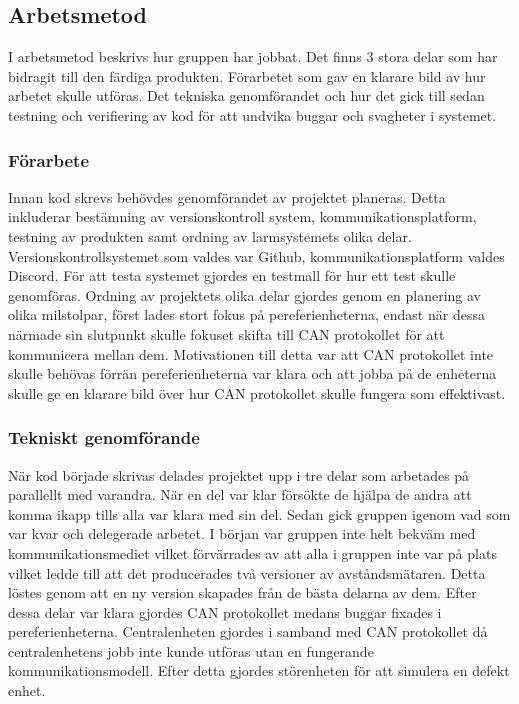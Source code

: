 \documentclass{article}
\begin{document}
\subsection{Arbetsmetod}
I arbetsmetod beskrivs hur gruppen har jobbat. Det finns 3 stora delar som har bidragit till den färdiga produkten. Förarbetet som gav en klarare bild av hur arbetet skulle utföras. Det tekniska genomförandet och hur det gick till sedan testning och verifiering av kod för att undvika buggar och svagheter i systemet.


\subsubsection{Förarbete}
Innan kod skrevs behövdes genomförandet av projektet planeras. 
Detta inkluderar bestämning av versionskontroll system, kommunikationsplatform, testning av produkten samt ordning av larmsystemets olika delar. 
Versionskontrollsystemet som valdes var Github, kommunikationsplatform valdes Discord. 
För att testa systemet gjordes en testmall för hur ett test skulle genomföras. 
Ordning av projektets olika delar gjordes genom en planering av olika milstolpar, först lades stort fokus på pereferienheterna, endast när dessa närmade sin slutpunkt skulle fokuset skifta till CAN protokollet för att kommunicera mellan dem. 
Motivationen till detta var att CAN protokollet inte skulle behövas förrän pereferienheterna var klara och att jobba på de enheterna skulle ge en klarare bild över hur CAN protokollet skulle fungera som effektivast.

\subsubsection{Tekniskt genomförande}
När kod började skrivas delades projektet upp i tre delar som arbetades på parallellt med varandra.
När en del var klar försökte de hjälpa de andra att komma ikapp tills alla var klara med sin del.
Sedan gick gruppen igenom vad som var kvar och delegerade arbetet. 
I början var gruppen inte helt bekväm med kommunikationsmediet vilket förvärrades av att alla i gruppen inte var på plats vilket ledde till att det producerades två versioner av avståndsmätaren.
Detta löstes genom att en ny version skapades från de bästa delarna av dem.
Efter dessa delar var klara gjordes CAN protokollet medans buggar fixades i pereferienheterna. Centralenheten gjordes i samband med CAN protokollet då centralenhetens jobb inte kunde utföras utan en fungerande kommunikationsmodell.
Efter detta gjordes störenheten för att simulera en defekt enhet.
\end{document}
